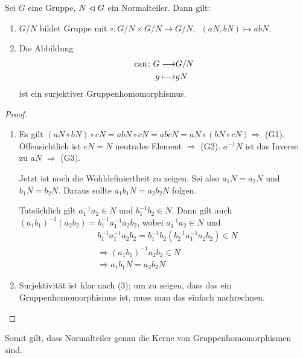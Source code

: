 \documentclass[12pt,a4paper]{scrartcl}
\begin{document}

\begin{satz} \label{thm:nt}
	Sei $G$ eine Gruppe, $N\vartriangleleft G$ ein Normalteiler. Dann gilt:
	\begin{enumerate}
		\item $G/N$ bildet Gruppe mit $\circ\colon G/N\times G/N \to G/N,\enspace (aN, bN)\mapsto abN$.
		\item Die Abbildung 
		\begin{eqnarray*}
			\operatorname{can}\colon G \longrightarrow& G/N\\
			g \longmapsto& gN
		\end{eqnarray*}
	ist ein surjektiver Gruppenhomomorphismus.
	\end{enumerate}
\end{satz}

\begin{proof}
	\leavevmode
	\begin{enumerate}
		\item Es gilt $(aN\circ bN)\circ cN = abN\circ cN = abc N = aN\circ (bN\circ cN) \Rightarrow$ (G1).
		Offensichtlich ist $eN = N$ neutrales Element $\Rightarrow$ (G2).
		$a^{-1}N$ ist das Inverse zu $aN$ $\Rightarrow$ (G3).
		
		Jetzt ist noch die Wohldefiniertheit zu zeigen. Sei also $a_1N = a_2N$ und $b_1N = b_2N$. Daraus sollte $a_1b_1N = a_2b_2N$ folgen.
		
		Tatsächlich gilt $a_1^{-1}a_2 \in N$ und $b_1^{-1}b_2\in N$. Dann gilt auch $(a_1b_1)^{-1}(a_2b_2) = b_1^{-1}a_1^{-1} a_2b_2$, wobei $a_1^{-1}a_2\in N$ und 
		\begin{align*}
		&b_1^{-1}a_1^{-1} a_2b_2 = b_1^{-1}b_2(b_2^{-1}a_1^{-1}a_2b_2)\in N \\
		&\Rightarrow (a_1b_1)^{-1}a_2b_2\in N \\
		&\Rightarrow a_1b_1N = a_2b_2N
		\end{align*}
		
		
		\item Surjektivität ist klar nach (3); um zu zeigen, dass das ein Gruppenhomomorphismus ist, muss man das einfach nachrechnen.
  \qedhere
	\end{enumerate}
\end{proof}

\begin{bem}
	Somit gilt, dass Normalteiler genau die Kerne von Gruppenhomomorphismen sind.
\end{bem}
\end{document}

